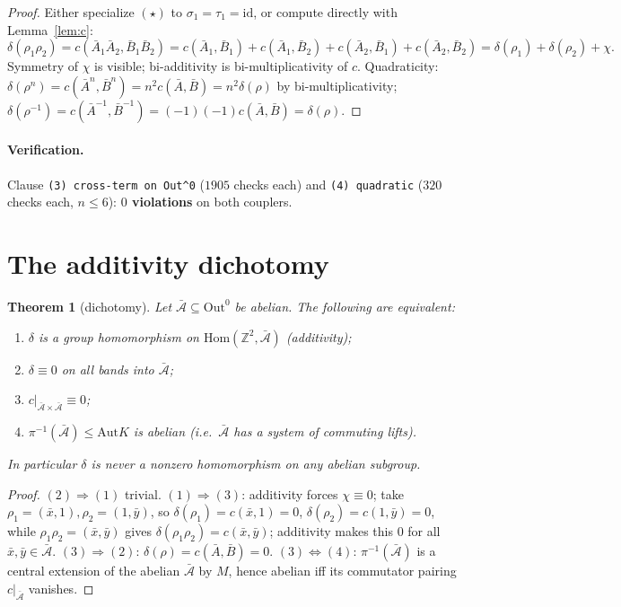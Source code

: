 \documentclass[11pt]{article}
\newtheorem{theorem}{Theorem}
\theoremstyle{definition}
\newcommand{\id}{\mathrm{id}}
\newcommand{\Z}{\mathbb{Z}}
\newcommand{\Aut}{\mathrm{Aut}}
\newcommand{\Out}{\mathrm{Out}}
\newcommand{\Hom}{\mathrm{Hom}}
\newcommand{\Ab}{\bar{\mathcal{A}}}
\begin{document}
\begin{proof}
Either specialize $(\star)$ to $\sigma_1=\tau_1=\id$, or compute directly with
Lemma~\ref{lem:c}:
\[
\delta(\rho_1\rho_2)=c(\bar A_1\bar A_2,\bar B_1\bar B_2)
=c(\bar A_1,\bar B_1)+c(\bar A_1,\bar B_2)+c(\bar A_2,\bar B_1)+c(\bar A_2,\bar B_2)
=\delta(\rho_1)+\delta(\rho_2)+\chi.
\]
Symmetry of $\chi$ is visible; bi-additivity is bi-multiplicativity of $c$.
Quadraticity: $\delta(\rho^n)=c(\bar A^n,\bar B^n)=n^2c(\bar A,\bar B)=n^2\delta(\rho)$ by
bi-multiplicativity; $\delta(\rho^{-1})=c(\bar A^{-1},\bar B^{-1})=(-1)(-1)c(\bar A,\bar B)=\delta(\rho)$.
\end{proof}

\paragraph{Verification.}
Clause \texttt{(3) cross-term on Out\^{}0} ($1905$ checks each) and \texttt{(4)
quadratic} ($320$ checks each, $n\le6$): \textbf{$0$ violations} on both couplers.

\section{The additivity dichotomy}\label{sec:dichotomy}

\begin{theorem}[dichotomy]\label{thm:dichotomy}
Let $\Ab\subseteq\Out^0$ be abelian. The following are equivalent:
\begin{enumerate}
\item $\delta$ is a group homomorphism on $\Hom(\Z^2,\Ab)$ (additivity);
\item $\delta\equiv0$ on all bands into $\Ab$;
\item $c|_{\Ab\times\Ab}\equiv0$;
\item $\pi^{-1}(\Ab)\le\Aut K$ is abelian (i.e.\ $\Ab$ has a system of commuting lifts).
\end{enumerate}
In particular $\delta$ is \emph{never a nonzero homomorphism} on any abelian subgroup.
\end{theorem}

\begin{proof}
$(2)\Rightarrow(1)$ trivial. $(1)\Rightarrow(3)$: additivity forces $\chi\equiv0$; take
$\rho_1=(\bar x,1),\rho_2=(1,\bar y)$, so $\delta(\rho_1)=c(\bar x,1)=0$,
$\delta(\rho_2)=c(1,\bar y)=0$, while $\rho_1\rho_2=(\bar x,\bar y)$ gives
$\delta(\rho_1\rho_2)=c(\bar x,\bar y)$; additivity makes this $0$ for all
$\bar x,\bar y\in\Ab$. $(3)\Rightarrow(2)$: $\delta(\rho)=c(\bar A,\bar B)=0$.
$(3)\Leftrightarrow(4)$: $\pi^{-1}(\Ab)$ is a central extension of the abelian $\Ab$ by
$M$, hence abelian iff its commutator pairing $c|_{\Ab}$ vanishes.
\end{proof}
\end{document}
